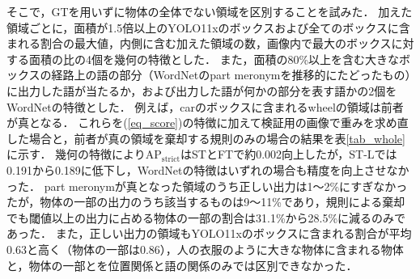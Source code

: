 そこで，GTを用いずに物体の全体でない領域を区別することを試みた．
加えた領域ごとに，面積が1.5倍以上のYOLO11xのボックスおよび全てのボックスに含まれる割合の最大値，内側に含む加えた領域の数，画像内で最大のボックスに対する面積の比の4個を幾何の特徴とした．
また，面積の80\%以上を含む大きなボックスの経路上の語の部分（WordNetのpart meronymを推移的にたどったもの）に出力した語が当たるか，および出力した語が何かの部分を表す語かの2個をWordNetの特徴とした．
例えば，carのボックスに含まれるwheelの領域は前者が真となる．
これらを(\ref{eq_score})の特徴に加えて検証用の画像で重みを求め直した場合と，前者が真の領域を棄却する規則のみの場合の結果を表\ref{tab_whole}に示す．
幾何の特徴によりAP$ _{\mathrm{strict}} $はSTとFTで約0.002向上したが，ST-Lでは0.191から0.189に低下し，WordNetの特徴はいずれの場合も精度を向上させなかった．
part meronymが真となった領域のうち正しい出力は1〜2\%にすぎなかったが，物体の一部の出力のうち該当するものは9〜11\%であり，規則による棄却でも閾値以上の出力に占める物体の一部の割合は31.1\%から28.5\%に減るのみであった．
また，正しい出力の領域もYOLO11xのボックスに含まれる割合が平均0.63と高く（物体の一部は0.86），人の衣服のように大きな物体に含まれる物体と，物体の一部とを位置関係と語の関係のみでは区別できなかった．
\endgroup
